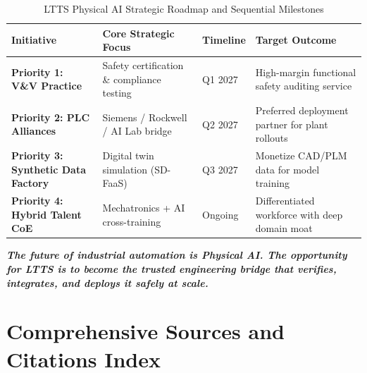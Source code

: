 \documentclass[11pt,a4paper]{article}
\begin{document}
\begin{table}[h!]
\centering
\small
\begin{tabularx}{\textwidth}{@{}l p{4.2cm} l X@{}}
\toprule
\textbf{Initiative} & \textbf{Core Strategic Focus} & \textbf{Timeline} & \textbf{Target Outcome} \\
\midrule
\textbf{Priority 1: V\&V Practice} & Safety certification \& compliance testing & Q1 2027 & High-margin functional safety auditing service \\
\textbf{Priority 2: PLC Alliances} & Siemens / Rockwell / AI Lab bridge & Q2 2027 & Preferred deployment partner for plant rollouts \\
\textbf{Priority 3: Synthetic Data Factory} & Digital twin simulation (SD-FaaS) & Q3 2027 & Monetize CAD/PLM data for model training \\
\textbf{Priority 4: Hybrid Talent CoE} & Mechatronics + AI cross-training & Ongoing & Differentiated workforce with deep domain moat \\
\bottomrule
\end{tabularx}
\caption{LTTS Physical AI Strategic Roadmap and Sequential Milestones}
\end{table}

\vspace{0.4cm}
\begin{center}
\small\color{textdark}\textbf{\textit{The future of industrial automation is Physical AI. The opportunity for LTTS is to become the trusted engineering bridge that verifies, integrates, and deploys it safely at scale.}}
\end{center}

\newpage
\appendix
\section{Comprehensive Sources and Citations Index}
\end{document}
